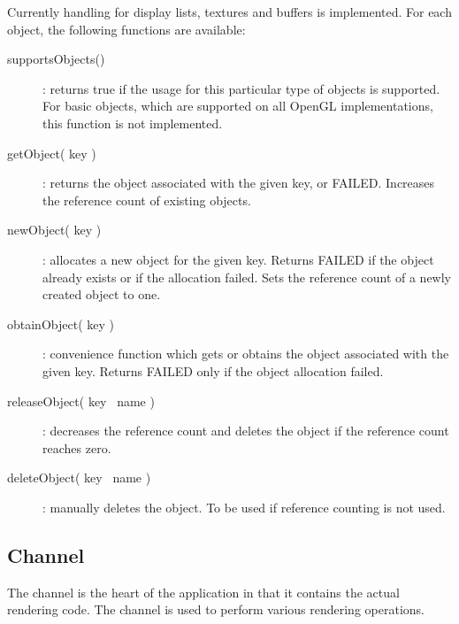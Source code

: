 \documentclass[10pt,a4]{scrartcl}
\begin{document}
Currently handling for display lists, textures and buffers is
implemented. For each object, the following functions are available:

\begin{description}
\item[supportsObjects()]: returns true if the usage for this particular
  type of objects is supported. For basic objects, which are supported
  on all OpenGL implementations, this function is not implemented.
\item[getObject( key )]: returns the object associated with the given
  key, or FAILED. Increases the reference count of existing objects.
\item[newObject( key )]: allocates a new object for the given
  key. Returns FAILED if the object already exists or if the allocation
  failed. Sets the reference count of a newly created object to one.
\item[obtainObject( key )]: convenience function which gets or obtains
  the object associated with the given key. Returns FAILED only if the
  object allocation failed.
\item[releaseObject( key \textbar\ name )]: decreases the reference count and
  deletes the object if the reference count reaches zero.
\item[deleteObject( key \textbar\ name )]: manually deletes the object. To be
  used if reference counting is not used.
\end{description}


\subsection{Channel}

The channel is the heart of the application in that it contains the
actual rendering code. The channel is used to perform various rendering
operations.

{\footnotesize\begin{lstlisting}
\end{lstlisting}}
\fi
\end{document}
